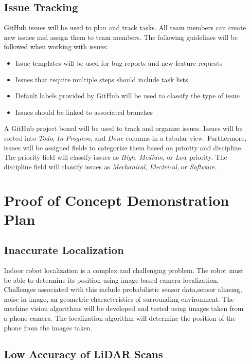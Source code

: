 \documentclass[titlepage]{article}
\begin{document}
\subsection{Issue Tracking}

GitHub issues will be used to plan and track tasks. All team members can create new issues and assign them to team members. The following guidelines will be followed when working with issues:

\begin{itemize}
\item Issue templates will be used for bug reports and new feature requests
\item Issues that require multiple steps should include task lists
\item Default labels provided by GitHub will be used to classify the type of issue
\item Issues should be linked to associated branches
\end{itemize}

A GitHub project board will be used to track and organize issues. Issues will be sorted into \textit{Todo}, \textit{In Progress}, and \textit{Done} columns in a tabular view. Furthermore, issues will be assigned fields to categorize them based on priority and discipline. The priority field will classify issues as \textit{High}, \textit{Medium}, or \textit{Low} priority. The discipline field will classify issues as \textit{Mechanical}, \textit{Electrical}, or \textit{Software}.

\section{Proof of Concept Demonstration Plan}

\subsection{Inaccurate Localization}
Indoor robot localization is a complex and challenging problem.
The robot must be able to determine its position using image based camera localization. Challenges associated with this include probabilistic sensor data,sensor aliasing, noise in image, an geometric characteristics of surrounding environment. The machine vision algorithms will be developed and tested using images taken from a phone camera. The localization algorithm will determine the position of the phone from the images taken.

\subsection{Low Accuracy of LiDAR Scans}
\end{document}
